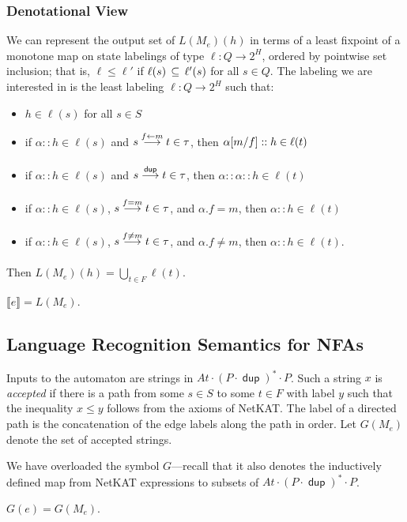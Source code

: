 \documentclass{article}
\newcommand\den[1]{\llbracket #1\rrbracket}
\newcommand\At{\ensuremath{\mathit{At}}}
\newcommand\pdup{\mathop{\mathsf{dup}}}
\renewcommand\star{^{\textstyle *}}
\renewcommand\powerset[1]{2^{#1}}
\begin{document}
\subsubsection*{Denotational View}

We can represent the output set of $L(M_e)(h)$ in terms of a least fixpoint of a monotone map on state labelings of type $\ell:Q\to\powerset H$, ordered by pointwise set inclusion; that is, $\ell\leq\ell'$ if $\ell(s)\,\subseteq\,\ell'(s)$ for all $s\in Q$. The labeling we are interested in is the least labeling $\ell:Q\to\powerset H$ such that:
\begin{itemize}
\item
$h\in \ell(s)$ for all $s\in S$
\item
if $\alpha::h \in \ell(s)$ and $s\underset{}{\overset{f\leftarrow m}\longrightarrow}t\in\tau$, then $\alpha[m/f]::h \in \ell(t)$
\item
if $\alpha::h \in \ell(s)$ and $s\goesto{\pdup}{}t\in\tau$, then $\alpha::\alpha::h \in \ell(t)$
\item
if $\alpha::h \in \ell(s)$, $s\underset{}{\overset{f=m}\longrightarrow}t\in\tau$, and $\alpha.f=m$, then $\alpha::h \in \ell(t)$
\item
if $\alpha::h \in \ell(s)$, $s\underset{}{\overset{f\neq m}\longrightarrow}t\in\tau$, and $\alpha.f\neq m$, then $\alpha::h \in \ell(t)$.
\end{itemize}
Then $L(M_e)(h) = \bigcup_{t\in F}\ell(t)$.

\begin{theorem}
$\den e = L(M_e)$.
\end{theorem}

\subsection*{Language Recognition Semantics for NFAs}

Inputs to the automaton are strings in $\At\cdot(P\cdot\pdup)\star\cdot P$. Such a string $x$ is \emph{accepted} if there is a path from some $s\in S$ to some $t\in F$ with label $y$ such that the inequality $x\leq y$ follows from the axioms of NetKAT. The label of a directed path is the concatenation of the edge labels along the path in order. Let $G(M_e)$ denote the set of accepted strings.

We have overloaded the symbol $G$---recall that it also denotes the inductively defined map from NetKAT expressions to subsets of $\At\cdot(P\cdot\pdup)\star\cdot P$.

\begin{theorem}
$G(e) = G(M_e)$.
\end{theorem}
\end{document}
